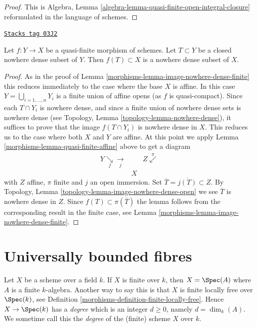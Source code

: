 \begin{proof}
This is
Algebra, Lemma \ref{algebra-lemma-quasi-finite-open-integral-closure}
reformulated in the language of schemes.
\end{proof}

\begin{lemma}
\label{morphisms-lemma-image-nowhere-dense-quasi-finite}
\href{https://stacks.math.columbia.edu/tag/03J2}{\texttt{Stacks tag 03J2}}

Let $f : Y \to X$ be a quasi-finite morphism of schemes.
Let $T \subset Y$ be a closed nowhere dense subset of $Y$.
Then $f(T) \subset X$ is a nowhere dense subset of $X$.
\end{lemma}

\begin{proof}

As in the proof of Lemma \ref{morphisms-lemma-image-nowhere-dense-finite} this
reduces immediately to the case where the base $X$ is affine.
In this case $Y = \bigcup_{i = 1, \ldots, n} Y_i$ is a finite union
of affine opens (as $f$ is quasi-compact). Since each $T \cap Y_i$
is nowhere dense, and since a finite union of nowhere dense sets is
nowhere dense (see
Topology, Lemma \ref{topology-lemma-nowhere-dense}),
it suffices to prove that the image $f(T \cap Y_i)$ is nowhere dense in $X$.
This reduces us to the case where both $X$ and $Y$ are affine. At this point
we apply Lemma \ref{morphisms-lemma-quasi-finite-affine} above to get a diagram
$$
\begin{array}{ccc}Y \underset{f}{\searrow}\underset{j}{\longrightarrow} &  & Z \overset{\pi}{\swarrow} \\  & X & \end{array}
$$
with $Z$ affine, $\pi$ finite and $j$ an open immersion.
Set $\overline{T} = \overline{j(T)} \subset Z$. By
Topology, Lemma \ref{topology-lemma-image-nowhere-dense-open}
we see $\overline{T}$ is nowhere dense in $Z$.
Since $f(T) \subset \pi(\overline{T})$
the lemma follows from the corresponding result in the finite case, see
Lemma \ref{morphisms-lemma-image-nowhere-dense-finite}.
\end{proof}

\section{Universally bounded fibres}
\label{morphisms-section-universally-bounded}
Let $X$ be a scheme over a field $k$. If $X$ is finite over $k$,
then $X = \Spec(A)$ where $A$ is a finite $k$-algebra. Another way
to say this is that $X$ is finite locally free over $\Spec(k)$,
see Definition \ref{morphisms-definition-finite-locally-free}. Hence
$X \to \Spec(k)$ has a {\it degree} which is an integer $d \geq 0$,
namely $d = \dim_k(A)$. We sometime call this the {\it degree} of the (finite)
scheme $X$ over $k$.

